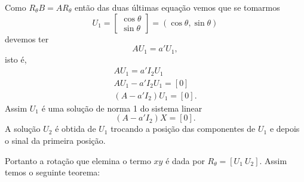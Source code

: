 Como $R_\theta B = AR_\theta$ ent\~ao das duas \'ultimas equa\c{c}\~ao vemos que se tomarmos
\[
  U_1 = \begin{bmatrix}
    \cos\theta\\
    \sin\theta
  \end{bmatrix} = (\cos\theta, \sin\theta)
\]
devemos ter
\[
  AU_1 = a'U_1,
\]
isto \'e,
\begin{align*}
  AU_1 = a'I_2 U_1\\
  AU_1 - a'I_2 U_1 = [0]\\
  (A - a'I_2)U_1 = [0].
\end{align*}
Assim $U_1$ \'e uma solu\c{c}\~ao de norma 1 do sistema linear
\[
  (A - a'I_2)X = [0].
\]
A solu\c{c}\~ao $U_2$ \'e obtida de $U_1$ trocando a posi\c{c}\~ao das componentes de $U_1$ e depois o sinal da primeira posi\c{c}\~ao.

Portanto a rota\c{c}\~ao que elemina o termo $xy$ \'e dada por $R_\theta = [U_1\ U_2]$. Assim temos o seguinte teorema:

